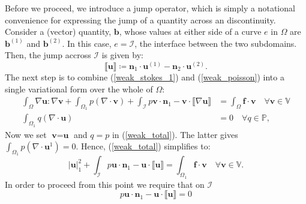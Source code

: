 \documentclass[12pt,a4paper]{article}
\theoremstyle{definition}
\begin{document}
Before we proceed, we introduce a jump operator, which is simply a notational convenience for expressing the jump of a quantity across an discontinuity.  Consider a (vector) quantity, $\textbf{b}$, whose values at either side of a curve $e$ in $\Omega$ are $\textbf{b}^{\left(1\right)}$ and $\textbf{b}^{\left(2\right)}$.  In this case, $e = \mathcal{I}$, the interface between the two subdomains.  Then, the jump accross $\mathcal{I}$ is given by:
\begin{equation}
\llbracket \textbf{u} \rrbracket \coloneqq \textbf{n}_1\cdot \textbf{u}^{\left(1\right)}-\textbf{n}_2\cdot  \textbf{u}^{\left(2\right)}.
\end{equation}
The next step is to combine (\ref{weak_stokes_1}) and (\ref{weak_poisson}) into a single variational form over the whole of $\Omega$:
\begin{equation}\label{weak_total}
\begin{aligned}
\int_{\Omega}\nabla \textbf{u} : \nabla \textbf{v}+\int_{\Omega_1}p\left(\nabla \cdot \textbf{v}\right) +\int_{\mathcal{I}} p\textbf{v}\cdot \textbf{n}_1-\textbf{v}\cdot\llbracket\nabla\textbf{u}\rrbracket &=\int_{\Omega}\textbf{f}\cdot \textbf{v} \quad \forall  \textbf{v}\in \mathbb{V}\\
\int_{\Omega_1}q\left(\nabla \cdot \textbf{u}\right) &= 0\quad \forall q\in \mathbb{P},
\end{aligned}
\end{equation}
Now we set $\textbf{v}=\textbf{u}$  and $q=p$ in (\ref{weak_total}).  The latter gives $\int_{\Omega_1}p\left(\nabla \cdot \textbf{u}^1\right)=0$.  Hence, (\ref{weak_total}) simplifies to:
\begin{equation}
	\left|\textbf{u}\right|_1^2 + \int_{\mathcal{I}}p\textbf{u}\cdot \textbf{n}_1-\textbf{u}\cdot\llbracket \textbf{u}\rrbracket =\int_{\Omega_1}\textbf{f}\cdot \textbf{v}   \quad \forall  \textbf{v}\in \mathbb{V}.
\end{equation}
In order to proceed from this point we require that on $\mathcal{I}$
\begin{equation}
p\textbf{u}\cdot \textbf{n}_1-\textbf{u}\cdot\llbracket \textbf{u}\rrbracket=0
\end{equation}
\end{document}
